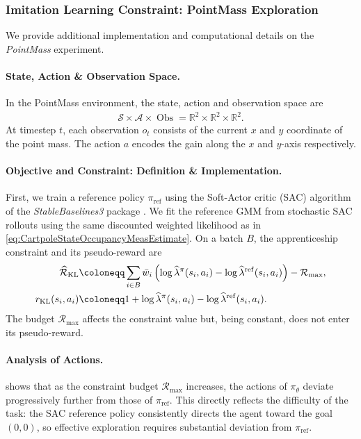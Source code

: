 \documentclass{article}
\theoremstyle{plain}
\theoremstyle{definition}
\theoremstyle{remark}
\def\RR{{\mathbb{R}}}
\def\SS{{\mathcal{S}}}
\def\AA{{\mathcal{A}}}
\newcommand{\define}{\coloneqq}
\def\lambdaHat{{\widehat{\lambda}}}
\def\ss{{s}}
\def\aa{{a}}
\def\ss{{s}}
\def\Reg{{\mathcal{R}}}
\def\rMax{{\mathcal{R}_{\max}}}
\DeclareMathOperator{\Obs}{Obs}
\begin{document}
\subsubsection{Imitation Learning Constraint: PointMass Exploration}
\label{sec:AppDetailsPointMass}
We provide additional implementation and computational details on
the \emph{PointMass} experiment.

\paragraph{State, Action \& Observation Space.} In the PointMass environment, the state, action and observation space are
\begin{align*}
 \SS \times \AA \times \Obs = \RR^2 \times \RR^2 \times \RR^2.
\end{align*}
At timestep $t$, each observation $o_t$ consists of the current $x$
and $y$ coordinate of the point mass. The action $\aa$ encodes the gain
along the $x$ and $y$-axis respectively.

\paragraph{Objective and Constraint: Definition \& Implementation.} First, we train a reference policy $\pi_{\mathrm{ref}}$ using the
Soft-Actor critic (SAC) algorithm of the \emph{StableBaselines3} package
\cite{raffinStableBaselines3ReliableReinforcement2021}. We fit the
reference GMM from stochastic SAC rollouts using the same discounted
weighted likelihood as in \eqref{eq:CartpoleStateOccupancyMeasEstimate}. On
a batch $B$, the apprenticeship constraint and its pseudo-reward are
\begin{align*}
 \widehat{\Reg}_{\rm KL}
  & \define\sum_{i\in B}\bar w_i
 \left(\log\lambdaHat^\pi(\ss_i,\aa_i)
 -\log\lambdaHat^{\rm ref}(\ss_i,\aa_i)\right)-\rMax, \\
 r_{\rm KL}(\ss_i,\aa_i)
  & \define1+\log\lambdaHat^\pi(\ss_i,\aa_i)
 -\log\lambdaHat^{\rm ref}(\ss_i,\aa_i).
\end{align*}
The budget $\rMax$ affects the constraint value but, being constant, does
not enter its pseudo-reward.

\paragraph{Analysis of Actions.}
 shows that as the constraint budget
$\rMax$ increases, the actions of $\pi_\theta$ deviate progressively further
from those of $\pi_{\mathrm{ref}}$. This directly reflects the difficulty
of the task: the SAC reference policy consistently directs the agent toward
the goal $(0,0)$, so effective exploration requires substantial deviation
from $\pi_{\mathrm{ref}}$.
\end{document}
